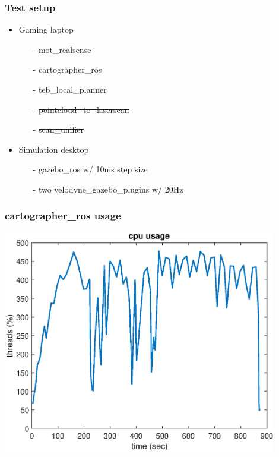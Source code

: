 \documentclass{beamer}
\newcommand{\<}{\langle}
\theoremstyle{example}
\begin{document}
\begin{frame}
  \frametitle{Test setup}
  \begin{itemize}
    \item Gaming laptop
    \begin{itemize}
      \item[-] mot\_realsense
      \item[-] cartographer\_ros
      \item[-] teb\_local\_planner
      \item[-] {\color{red} \sout{pointcloud\_to\_laserscan}}
      \item[-] {\color{red} \sout{scan\_unifier}}
    \end{itemize}
    \item Simulation desktop
    \begin{itemize}
      \item[-] gazebo\_ros w/ 10ms step size
      \item[-] two velodyne\_gazebo\_plugins w/ 20Hz
    \end{itemize}
  \end{itemize}
\end{frame}

\begin{frame}
  \frametitle{cartographer\_ros usage}
  \begin{center}
    \includegraphics[width=0.9\textwidth]{fig/cartographer.eps}
  \end{center}
\end{frame}
\end{document}
